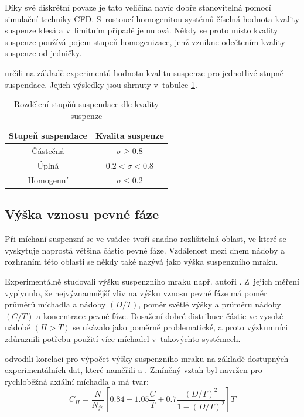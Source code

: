 \noindent Díky své diskrétní povaze je tato veličina navíc dobře stanovitelná pomocí simulační techniky CFD. S~rostoucí homogenitou systémů číselná hodnota kvality suspenze klesá a v~limitním případě je nulová. Někdy se proto místo kvality suspenze používá pojem stupeň homogenizace, jenž vznikne odečtením kvality suspenze od jedničky.

\citet{boh80} určili na základě experimentů hodnotu kvalitu suspenze pro jednotlivé stupně suspendace. Jejich výsledky jsou shrnuty v~tabulce \ref{tab:kvasus}.

\begin{table}[h!]
\centering
\caption{Rozdělení stupňů suspendace dle kvality suspenze}
\label{tab:kvasus}
\begin{tabular}{cc}
\toprule
Stupeň suspendace & Kvalita suspenze \\
\midrule

Částečná &  $\sigma \geq \num{0.8}$ \\
Úplná & $\num{0.2} < \sigma < \num{0.8}$ \\
Homogenní & $\sigma \leq \num{0.2}$ \\

\bottomrule
\end{tabular}
\end{table}

\subsection{Výška vznosu pevné fáze}
Při míchaní suspenzní se ve vsádce tvoří snadno rozlišitelná oblast, ve které se vyskytuje naprostá většina částic pevné fáze. Vzdálenost mezi dnem nádoby a rozhraním této oblasti se někdy také nazývá jako výška suspenzního mraku. 

Experimentálně studovali výšku suspenzního mraku např. autoři \citet{hic97}. Z~jejich měření vyplynulo, že nejvýznamnější vliv na výšku vznosu pevné fáze má poměr průměrů míchadla a nádoby $(D/T)$, poměr světlé výšky a průměru nádoby $(C/T)$ a koncentrace pevné fáze. Dosažení dobré distribuce částic ve vysoké nádobě $(H > T)$ se ukázalo jako poměrně problematické, a proto výzkumníci zdůraznili potřebu použití více míchadel v~takovýchto systémech.

\citet{bit02} odvodili korelaci pro výpočet výšky suspenzního mraku na základě dostupných experimentálních dat, které naměřili \citet{hic97} a \citet{buj99}. Zmíněný vztah byl navržen pro rychloběžná axiální míchadla a má tvar:
\begin{equation}
	C_{H}=\frac{N}{N_{js}}\left[\num{0.84} - \num{1.05}\frac{C}{T} + \num{0.7}\frac{(D/T)^{2}}{1 - (D/T)^{2}}  \right]T
	\label{eq:sushei}
\end{equation}  


